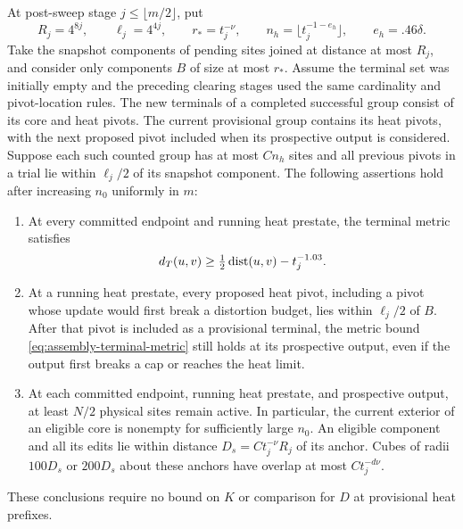 \begin{lemma}
\label{lem:clearing-locality}
At post-sweep stage $j\le\lfloor m/2\rfloor$, put
\[
 R_j=4^{8j},\qquad \ell_j=4^{4j},\qquad
 r_*=t_j^{-\nu},\qquad n_h=\lfloor t_j^{-1-e_h}\rfloor,
 \qquad e_h=.46\delta.
\]
Take the snapshot components of pending sites joined at distance at most
$R_j$, and consider only components $B$ of size at most $r_*$.
Assume the terminal set was initially empty and the preceding clearing
stages used the same cardinality and pivot-location rules. The new terminals
of a completed successful group consist of its core and heat pivots. The
current provisional group contains its heat pivots, with the next proposed
pivot included when its prospective output is considered. Suppose each
such counted group has at most $Cn_h$ sites and all previous pivots in a
trial lie within $\ell_j/2$ of its snapshot component. The following
assertions hold after increasing $n_0$ uniformly in $m$:
\begin{enumerate}
\item At every committed endpoint and running heat prestate, the
terminal metric satisfies
\begin{equation}
 d_T(u,v)\ge\tfrac12\operatorname{dist}(u,v)-t_j^{-1.03}.
 \label{eq:assembly-terminal-metric}
\end{equation}
\item At a running heat prestate, every proposed heat pivot, including a pivot whose update
would first break a distortion budget, lies within $\ell_j/2$ of $B$.
After that pivot is included as a provisional terminal, the metric bound
\eqref{eq:assembly-terminal-metric} still holds at its prospective output,
even if the output first breaks a cap or reaches the heat limit.
\item At each committed endpoint, running heat prestate, and prospective output,
at least $N/2$ physical
sites remain active. In particular, the current exterior of an eligible
core is nonempty for sufficiently large $n_0$.
An eligible component and all its edits lie within distance
$D_s=Ct_j^{-\nu}R_j$ of its anchor. Cubes of radii $100D_s$ or $200D_s$
about these anchors have overlap at most $Ct_j^{-d\nu}$.
\end{enumerate}
These conclusions require no bound on $K$ or comparison for $D$ at
provisional heat prefixes.
\end{lemma}

